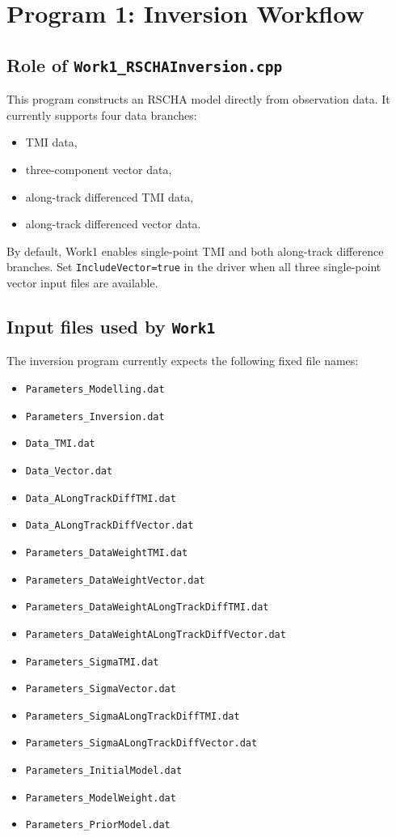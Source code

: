 \documentclass[11pt,a4paper]{article}
\begin{document}
\section{Program 1: Inversion Workflow}

\subsection{Role of \texttt{Work1\_RSCHAInversion.cpp}}

This program constructs an RSCHA model directly from observation data. It currently supports four data branches:
\begin{itemize}
  \item TMI data,
  \item three-component vector data,
  \item along-track differenced TMI data,
  \item along-track differenced vector data.
\end{itemize}

By default, Work1 enables single-point TMI and both along-track difference
branches. Set \texttt{IncludeVector=true} in the driver when all three
single-point vector input files are available.

\subsection{Input files used by \texttt{Work1}}

The inversion program currently expects the following fixed file names:
\begin{itemize}
  \item \texttt{Parameters\_Modelling.dat}
  \item \texttt{Parameters\_Inversion.dat}
  \item \texttt{Data\_TMI.dat}
  \item \texttt{Data\_Vector.dat}
  \item \texttt{Data\_ALongTrackDiffTMI.dat}
  \item \texttt{Data\_ALongTrackDiffVector.dat}
  \item \texttt{Parameters\_DataWeightTMI.dat}
  \item \texttt{Parameters\_DataWeightVector.dat}
  \item \texttt{Parameters\_DataWeightALongTrackDiffTMI.dat}
  \item \texttt{Parameters\_DataWeightALongTrackDiffVector.dat}
  \item \texttt{Parameters\_SigmaTMI.dat}
  \item \texttt{Parameters\_SigmaVector.dat}
  \item \texttt{Parameters\_SigmaALongTrackDiffTMI.dat}
  \item \texttt{Parameters\_SigmaALongTrackDiffVector.dat}
  \item \texttt{Parameters\_InitialModel.dat}
  \item \texttt{Parameters\_ModelWeight.dat}
  \item \texttt{Parameters\_PriorModel.dat}
\end{itemize}
\end{document}
